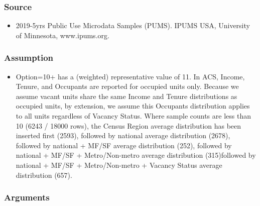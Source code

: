 \subsubsection{Source}\label{source-125}

\begin{itemize}
 
\item
  2019-5yrs Public Use Microdata Samples (PUMS). IPUMS USA, University
  of Minnesota, www.ipums.org.
\end{itemize}

\subsubsection{Assumption}\label{assumption-72}

\begin{itemize}
 
\item
  Option=10+ has a (weighted) representative value of 11. In ACS,
  Income, Tenure, and Occupants are reported for occupied units only.
  Because we assume vacant units share the same Income and Tenure
  distributions as occupied units, by extension, we assume this
  Occupants distribution applies to all units regardless of Vacancy
  Status. Where sample counts are less than 10 (6243 / 18000 rows), the
  Census Region average distribution has been inserted first (2593),
  followed by national average distribution (2678), followed by national
  +
  \textquotesingle MF\textquotesingle/\textquotesingle SF\textquotesingle{}
  average distribution (252), followed by national +
  \textquotesingle MF\textquotesingle/\textquotesingle SF\textquotesingle{}
  +
  \textquotesingle Metro\textquotesingle/\textquotesingle Non-metro\textquotesingle{}
  average distribution (315)followed by national +
  \textquotesingle MF\textquotesingle/\textquotesingle SF\textquotesingle{}
  +
  \textquotesingle Metro\textquotesingle/\textquotesingle Non-metro\textquotesingle{}
  + Vacancy Status average distribution (657).
\end{itemize}

\subsubsection{Arguments}\label{arguments-86}

